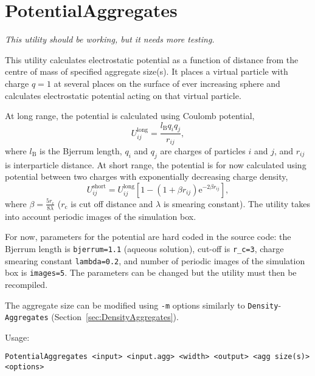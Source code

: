 \section{PotentialAggregates} \label{sec:PotentialAggregates}

{\em This utility should be working, but it needs more testing.}

This utility calculates electrostatic potential as a function of distance
from the centre of mass of specified aggregate size(s). It places a virtual
particle with charge $q=1$ at several places on the surface of ever
increasing sphere and calculates electrostatic potential acting on that
virtual particle.

At long range, the potential is calculated using Coulomb potential,
\begin{equation} \label{eq:Coulomb}
  U_{ij}^{\mathrm{long}} = \frac{l_{\mathrm{B}} q_i q_j}{r_{ij}},
\end{equation}
where $l_{\mathrm{B}}$ is the Bjerrum length, $q_i$ and $q_j$ are charges
of particles $i$ and $j$, and $r_{ij}$ is interparticle distance. At short
range, the potential is for now calculated using potential between two
charges with exponentially decreasing charge density,
\begin{equation} \label{eq:Slater}
  U_{ij}^{\mathrm{short}} = U_{ij}^{\mathrm{long}}\left[1 - \left(1 + \beta
  r_{ij}\right) \mathrm{e}^{-2\beta r_{ij}}\right],
\end{equation}
where $\beta=\frac{5r_{\mathrm{c}}}{8\lambda}$ ($r_{\mathrm{c}}$ is cut off
distance and $\lambda$ is smearing constant). The utility takes into
account periodic images of the simulation box.

For now, parameters for the potential are hard coded in the source code:
the Bjerrum length is \texttt{bjerrum=1.1} (aqueous solution), cut-off is
\texttt{r\_c=3}, charge smearing constant \texttt{lambda=0.2}, and number
of periodic images of the simulation box is \texttt{images=5}. The
parameters can be changed but the utility must then be recompiled.

The aggregate size can be modified using \texttt{-m} options similarly to
\texttt{Density}-\texttt{Aggregates}
(Section~\ref{sec:DensityAggregates}).

Usage:

\vspace{1em}
\noindent
\texttt{PotentialAggregates <input> <input.agg> <width> <output> <agg size(s)> <options>}

